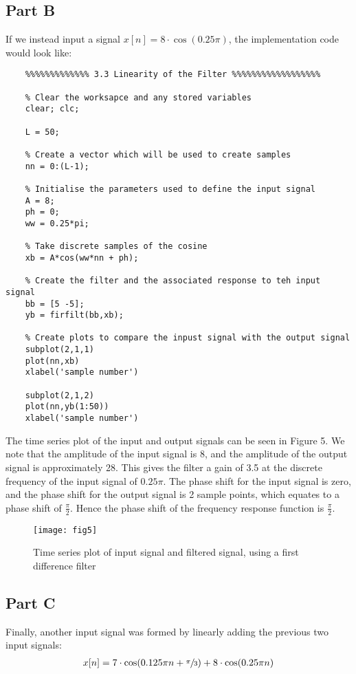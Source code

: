 \documentclass{article}
\begin{document}
\subsection{Part B}

If we instead input a signal $x[n] = 8 \cdot \cos(0.25 \pi)$, the implementation code would look like:
\begin{lstlisting}
	%%%%%%%%%%%%% 3.3 Linearity of the Filter %%%%%%%%%%%%%%%%%%
	
	% Clear the worksapce and any stored variables
	clear; clc;
	
	L = 50;
	
	% Create a vector which will be used to create samples
	nn = 0:(L-1);
	
	% Initialise the parameters used to define the input signal
	A = 8;
	ph = 0;
	ww = 0.25*pi;
	
	% Take discrete samples of the cosine
	xb = A*cos(ww*nn + ph);
	
	% Create the filter and the associated response to teh input signal
	bb = [5 -5];
	yb = firfilt(bb,xb);
	
	% Create plots to compare the inpust signal with the output signal
	subplot(2,1,1)
	plot(nn,xb)
	xlabel('sample number')
	
	subplot(2,1,2)
	plot(nn,yb(1:50))
	xlabel('sample number')
\end{lstlisting}

The time series plot of the input and output signals can be seen in Figure 5. We note that the amplitude of the input signal is 8, and the amplitude of the output signal is approximately 28. This gives the filter a gain of 3.5 at the discrete frequency of the input signal of $0.25 \pi$. The phase shift for the input signal is zero, and the phase shift for the output signal is 2 sample points, which equates to a phase shift of $\frac{\pi}{2}$. Hence the phase shift of the frequency response function is $\frac{\pi}{2}$.

\begin{figure}[H]
	\centering
	\texttt{[image: fig5]}
	\caption{Time series plot of input signal and filtered signal, using a first difference filter}
\end{figure}

\subsection{Part C}
Finally, another input signal was formed by linearly adding the previous two input signals:
\begin{align*}
	x[n] = 7 \cdot \cos(0.125 \pi n + \sfrac{\pi}{3}) + 8 \cdot \cos(0.25 \pi n)
\end{align*}
\end{document}
